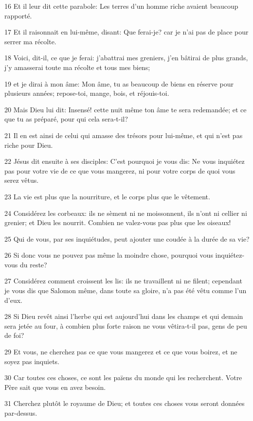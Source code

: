 \par 16 Et il leur dit cette parabole: Les terres d'un homme riche avaient beaucoup rapporté.
\par 17 Et il raisonnait en lui-même, disant: Que ferai-je? car je n'ai pas de place pour serrer ma récolte.
\par 18 Voici, dit-il, ce que je ferai: j'abattrai mes greniers, j'en bâtirai de plus grands, j'y amasserai toute ma récolte et tous mes biens;
\par 19 et je dirai à mon âme: Mon âme, tu as beaucoup de biens en réserve pour plusieurs années; repose-toi, mange, bois, et réjouis-toi.
\par 20 Mais Dieu lui dit: Insensé! cette nuit même ton âme te sera redemandée; et ce que tu as préparé, pour qui cela sera-t-il?
\par 21 Il en est ainsi de celui qui amasse des trésors pour lui-même, et qui n'est pas riche pour Dieu.
\par 22 Jésus dit ensuite à ses disciples: C'est pourquoi je vous dis: Ne vous inquiétez pas pour votre vie de ce que vous mangerez, ni pour votre corps de quoi vous serez vêtus.
\par 23 La vie est plus que la nourriture, et le corps plus que le vêtement.
\par 24 Considérez les corbeaux: ils ne sèment ni ne moissonnent, ils n'ont ni cellier ni grenier; et Dieu les nourrit. Combien ne valez-vous pas plus que les oiseaux!
\par 25 Qui de vous, par ses inquiétudes, peut ajouter une coudée à la durée de sa vie?
\par 26 Si donc vous ne pouvez pas même la moindre chose, pourquoi vous inquiétez-vous du reste?
\par 27 Considérez comment croissent les lis: ils ne travaillent ni ne filent; cependant je vous dis que Salomon même, dans toute sa gloire, n'a pas été vêtu comme l'un d'eux.
\par 28 Si Dieu revêt ainsi l'herbe qui est aujourd'hui dans les champs et qui demain sera jetée au four, à combien plus forte raison ne vous vêtira-t-il pas, gens de peu de foi?
\par 29 Et vous, ne cherchez pas ce que vous mangerez et ce que vous boirez, et ne soyez pas inquiets.
\par 30 Car toutes ces choses, ce sont les païens du monde qui les recherchent. Votre Père sait que vous en avez besoin.
\par 31 Cherchez plutôt le royaume de Dieu; et toutes ces choses vous seront données par-dessus.
